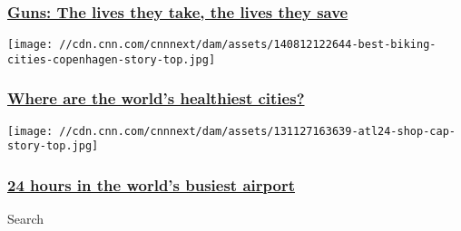 \hypertarget{guns-the-lives-they-take-the-lives-they-save}{%
\subsubsection{\texorpdfstring{\href{http://www.cnn.com/interactive/2014/12/us/cnn-guns-project/index.html}{Guns:
The lives they take, the lives they
save}}{Guns: The lives they take, the lives they save}}\label{guns-the-lives-they-take-the-lives-they-save}}

\href{http://www.cnn.com/interactive/2014/09/health/cnn10-healthiest-cities/}{}

\texttt{[image: //cdn.cnn.com/cnnnext/dam/assets/140812122644-best-biking-cities-copenhagen-story-top.jpg]}

\hypertarget{where-are-the-worlds-healthiest-cities}{%
\subsubsection{\texorpdfstring{\href{http://www.cnn.com/interactive/2014/09/health/cnn10-healthiest-cities/}{Where
are the world's healthiest
cities?}}{Where are the world's healthiest cities?}}\label{where-are-the-worlds-healthiest-cities}}

\href{http://www.cnn.com/ATL24}{}

\texttt{[image: //cdn.cnn.com/cnnnext/dam/assets/131127163639-atl24-shop-cap-story-top.jpg]}

\hypertarget{24-hours-in-the-worlds-busiest-airport}{%
\subsubsection{\texorpdfstring{\href{http://www.cnn.com/ATL24}{24 hours
in the world's busiest
airport}}{24 hours in the world's busiest airport}}\label{24-hours-in-the-worlds-busiest-airport}}

Search

